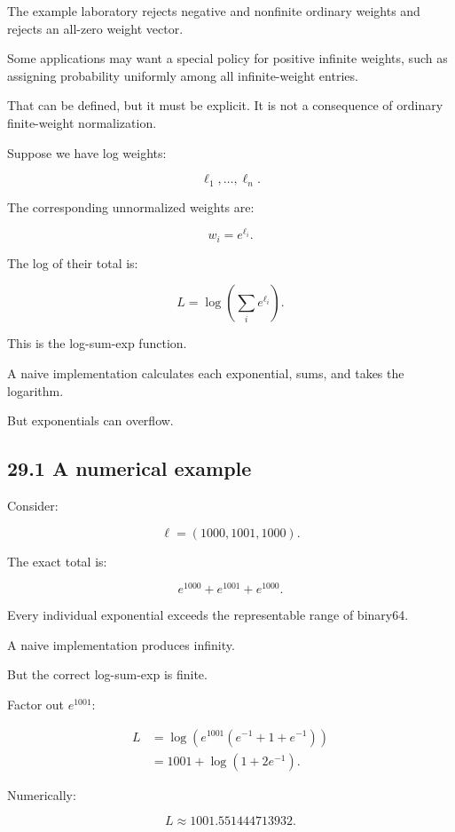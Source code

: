 The example laboratory rejects negative and nonfinite ordinary weights and rejects an all-zero weight vector.

Some applications may want a special policy for positive infinite weights, such as assigning probability uniformly among all infinite-weight entries.

That can be defined, but it must be explicit. It is not a consequence of ordinary finite-weight normalization.

Suppose we have log weights:

\[ \ell_1,\ldots,\ell_n. \]

The corresponding unnormalized weights are:

\[ w_i=e^{\ell_i}. \]

The log of their total is:

\[ \boxed{ L=\log\left(\sum_ie^{\ell_i}\right) }. \]

This is the log-sum-exp function.

A naive implementation calculates each exponential, sums, and takes the logarithm.

But exponentials can overflow.

\subsection{29.1 A numerical example}\label{02-foundations-ii-ch031-a-numerical-example}

\hypertarget{02-foundations-ii-ch031-a-numerical-example}{}

Consider:

\[ \ell=(1000,1001,1000). \]

The exact total is:

\[ e^{1000}+e^{1001}+e^{1000}. \]

Every individual exponential exceeds the representable range of binary64.

A naive implementation produces infinity.

But the correct log-sum-exp is finite.

Factor out \(e^{1001}\):

\[ \begin{aligned} L &= \log\left( e^{1001} (e^{-1}+1+e^{-1}) \right)\\ &= 1001+\log(1+2e^{-1}). \end{aligned} \]

Numerically:

\[ \boxed{ L\approx1001.551444713932 }. \]

